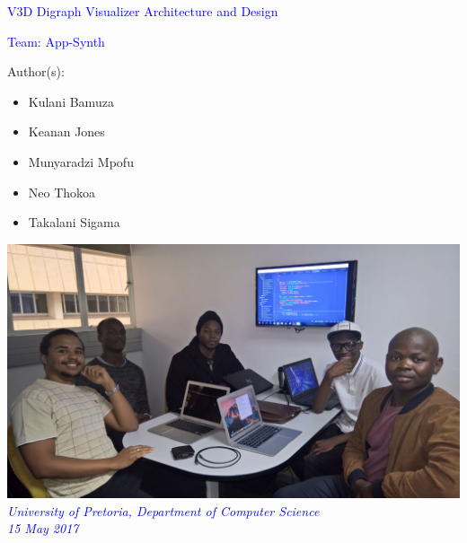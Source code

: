 \documentclass[12pt]{article}
\begin{document}
\begin{titlepage}
\begin{center}
\begin{huge}
\begin{center}
\textcolor{blue}{V3D Digraph Visualizer Architecture and Design}
\end{center}
\end{huge}
\hfill \break
\begin{Large}
\begin{center}
\textcolor{blue}{Team: App-Synth}
\end{center}
\end{Large}
\begin{small}
\begin{flushleft}
Author(s):
\end{flushleft}

\begin{itemize}
	\item Kulani Bamuza \\
	\item Keanan Jones \\
	\item Munyaradzi Mpofu\\
	\item Neo Thokoa\\	
	\item Takalani Sigama\\
	
\end{itemize}
\end{small}

\end{center}
\begin{center}
\includegraphics[scale=0.4]{Dps/TeamPic.jpg}
\\
\textcolor{blue}{\textit{University of Pretoria, Department of Computer Science
\\
15 May 2017}}

\end{center}
\end{titlepage}
\end{document}
